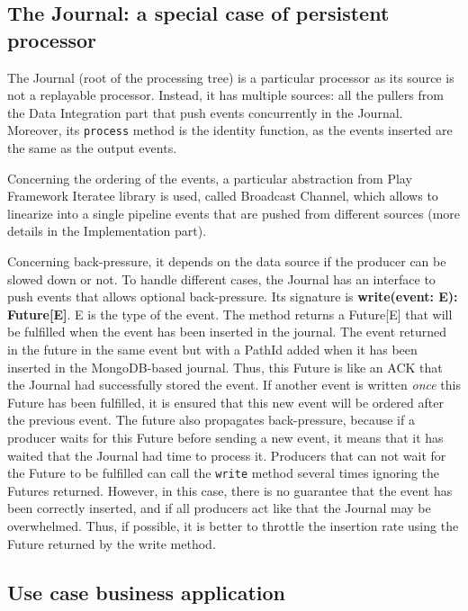 \subsection{The Journal: a special case of persistent processor}

The Journal (root of the processing tree) is a particular processor as its source is not a replayable processor. Instead, it has multiple sources: all the pullers from the Data
Integration part that push events concurrently in the Journal. Moreover, its \verb|process| method is the identity function, as the events inserted are the same as the output events.

Concerning the ordering of the events, a particular abstraction from Play Framework Iteratee library is used, called Broadcast Channel, which allows to linearize into a single pipeline events that are pushed from different sources (more details in the Implementation part).

Concerning back-pressure, it depends on the data source if the producer can be slowed down or not. To handle different cases, the Journal has an interface to push events that allows optional back-pressure. Its signature is \textbf{write(event: E): Future[E]}. E is the type of the event. The method returns a Future[E] that will be fulfilled when the event has been inserted in the journal. The event returned in the future in the same event but with a PathId added when it has been inserted in the MongoDB-based journal.
Thus, this Future is like an ACK that the Journal had successfully stored the event. If another event is written \textit{once} this Future has been fulfilled, it is ensured
that this new event will be ordered after the previous event. The future also propagates back-pressure, because if a producer waits for this Future before sending a new event, it means that it has waited that the Journal had time to process it. Producers that can not wait for the Future to be fulfilled can call the \verb|write| method several times
ignoring the Futures returned. However, in this case, there is no guarantee that the event has been correctly inserted, and if all producers act like that the Journal may be overwhelmed. Thus, if possible, it is better to throttle the insertion rate using the Future returned by the write method.

\subsection{Use case business application}
\label{sec:usecasebusiness}


